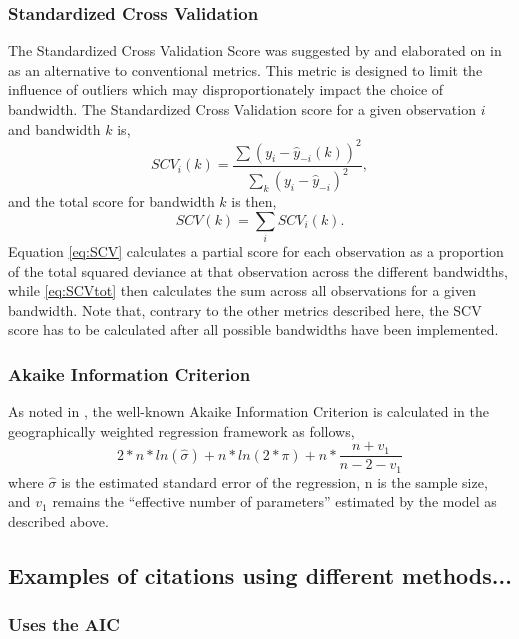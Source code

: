 \documentclass{article}\usepackage[]{graphicx}\usepackage[]{color}
\begin{document}
\subsubsection{Standardized Cross Validation}
The Standardized Cross Validation Score was suggested by \citep{Farber2007b} and elaborated on in \citep{Paez2011} as an alternative to conventional metrics. This metric is designed to limit the influence of outliers which may disproportionately impact the choice of bandwidth. The Standardized Cross Validation score for a given observation $i$ and bandwidth $k$ is, 
\begin{equation}\label{eq:SCV}
SCV_i (k) = \frac{\sum (y_i - \hat{y}_{-i}(k))^2} {\sum _k (y_i - \hat{y}_{-i})^2 },
\end{equation}
and the total score for bandwidth $k$ is then,
\begin{equation}\label{eq:SCVtot}
SCV(k) = \sum _i SCV_i(k).
\end{equation}
Equation \eqref{eq:SCV} calculates a partial score for each observation as a proportion of the total squared deviance at that observation across the different bandwidths, while \eqref{eq:SCVtot} then calculates the sum across all observations for a given bandwidth. Note that, contrary to the other metrics described here, the SCV score has to be calculated after all possible bandwidths have been implemented.

\subsubsection{Akaike Information Criterion}
As noted in \citep{Fotheringham2002}, the well-known Akaike Information Criterion is calculated in the geographically weighted regression framework as follows,
\begin{equation}\label{eq:AIC}
  2*n*ln(\hat{\sigma}) + n*ln(2*\pi) + 
    n*\frac{n + v_1}{n - 2 - v_1}
    \end{equation}
where $\hat{\sigma}$ is the estimated standard error of the regression, n is the sample size, and $v_1$ remains the ``effective number of parameters'' estimated by the model as described above.


\subsection{Examples of citations using different methods...}
\subsubsection{Uses the AIC}
\cite{Borst2007}
\citet{Axhausen2010}
\citet{Cahill2007}
\citet{Eckey2007}
\citet{Foody2003}
\citet{Hanink2010}
\citet{Haynes2011}
\citet{Helbich2009}
\citet{Kestens2005}
\citet{Partridge2008}
\citet{Partridge2007}
\citet{PinedaJaimes2010}
\citet{Sa2010}
\citet{Tu2008}
\citet{Yu2006}
\citet{Yu2007a}
\citet{Yu2007}
\end{document}
